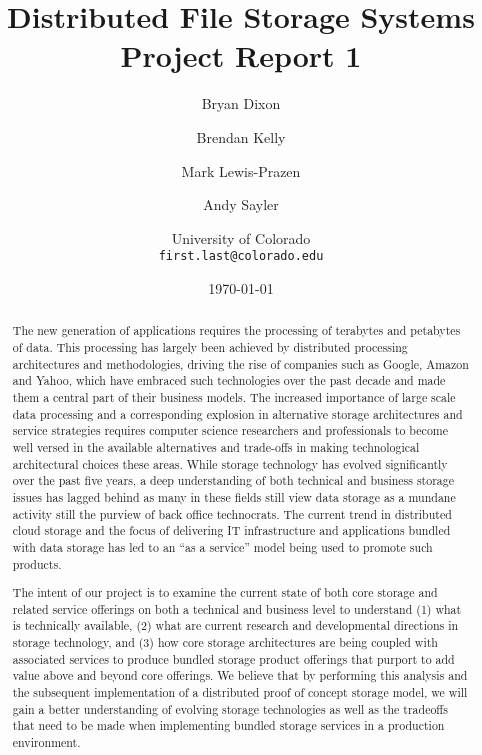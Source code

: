 \documentclass[11pt]{article}
\begin{document}
\title{
  Distributed File Storage Systems\\
  Project Report 1
}
\author{
  Bryan Dixon \and Brendan Kelly \and Mark Lewis-Prazen \and Andy Sayler\\
  \and University of Colorado\\
  \texttt{first.last@colorado.edu}
}
\date{\today}

\maketitle

\begin{abstract}
The new generation of applications requires the processing of
terabytes and petabytes of data. This processing has largely been
achieved by distributed processing architectures and methodologies,
driving the rise of companies such as Google, Amazon and Yahoo, which
have embraced such technologies over the past decade and made them a
central part of their business models. The increased importance of
large scale data processing and a corresponding explosion in
alternative storage architectures and service strategies requires
computer science researchers and professionals to become well versed
in the available alternatives and trade-offs in making technological
architectural choices these areas. While storage technology has
evolved significantly over the past five years, a deep understanding
of both technical and business storage issues has lagged behind as
many in these fields still view data storage as a mundane activity
still the purview of back office technocrats. The current trend in
distributed cloud storage and the focus of delivering IT
infrastructure and applications bundled with data storage has led to
an “as a service” model being used to promote such products.

The intent of our project is to examine the current state of both core
storage and related service offerings on both a technical and business
level to understand (1) what is technically available, (2) what are
current research and developmental directions in storage technology,
and (3) how core storage architectures are being coupled with
associated services to produce bundled storage product offerings that
purport to add value above and beyond core offerings. We believe that
by performing this analysis and the subsequent implementation of a
distributed proof of concept storage model, we will gain a better
understanding of evolving storage technologies as well as the
tradeoffs that need to be made when implementing bundled storage
services in a production environment.

\end{abstract}
\end{document}
